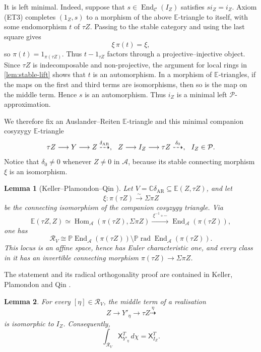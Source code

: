 \documentclass[11pt,reqno]{article}
\numberwithin{equation}{section}
\newtheorem{lemma}[lemma]{Lemma}
\theoremstyle{definition}
\DeclareMathOperator{\End}{End}
\DeclareMathOperator{\Hom}{Hom}
\newcommand{\C}{\mathcal C}
\newcommand{\A}{\mathcal A}
\newcommand{\Pcal}{\mathcal P}
\newcommand{\E}{\mathbb E}
\newcommand{\X}{\mathsf X}
\newcommand{\kk}{\mathbb C}
\newcommand{\etri}{\dashrightarrow}
\begin{document}
It is left minimal.  Indeed, suppose that $s\in\End_{\C}(I_Z)$ satisfies $s i_Z=i_Z$.  Axiom \textup{(ET3)} completes $(1_Z,s)$ to a morphism of the above $\E$-triangle to itself, with some endomorphism $t$ of $\tau Z$.  Passing to the stable category and using the last square gives
\[
 \xi\,\pi(t)=\xi,
\]
so $\pi(t)=1_{\pi(\tau Z)}$.  Thus $t-1_{\tau Z}$ factors through a projective--injective object. Since $\tau Z$ is indecomposable and non-projective, the argument for local rings in \cref{lem:stable-lift} shows that $t$ is an automorphism.  In a morphism of $\E$-triangles, if the maps on the first and third terms are isomorphisms, then so is the map on the middle term. Hence $s$ is an automorphism.  Thus $i_Z$ is a minimal left $\Pcal$-approximation.

We therefore fix an Auslander--Reiten $\E$-triangle and this minimal companion cosyzygy $\E$-triangle
\begin{equation}\label{eq:AR-and-cosy}
 \tau Z\longrightarrow Y\longrightarrow Z\overset{\delta_{\mathrm{AR}}}{\etri},
 \hspace{2.5mm}
 Z\longrightarrow I_Z\longrightarrow\tau Z\overset{\delta_0}{\etri},
 \hspace{2.5mm}I_Z\in\Pcal.
\end{equation}
Notice that $\delta_0\ne0$ whenever $Z\ne0$ in $\A$, because its stable connecting morphism $\xi$ is an isomorphism.

\begin{lemma}[Keller--Plamondon--Qin \cite{KellerPlamondonQin}]\label{known:AR-locus}
Let $V=\kk\delta_{\mathrm{AR}}\subseteq\E(Z,\tau Z)$, and let
\[
 \xi\colon\pi(\tau Z)\xrightarrow{\sim}\Sigma\pi Z
\]
be the connecting isomorphism of the companion cosyzygy triangle.  Via
\[
 \E(\tau Z,Z)
 \simeq\Hom_{\A}(\pi(\tau Z),\Sigma\pi Z)
 \xrightarrow{\ \xi^{-1}\circ-\ }
 \End_{\A}(\pi(\tau Z)),
\]
one has
\[
 \mathcal R_V
 \cong
 \mathbb P\End_{\A}(\pi(\tau Z))
 \setminus
 \mathbb P\operatorname{rad}\End_{\A}(\pi(\tau Z)).
\]
This locus is an affine space, hence has Euler characteristic one, and every class in it has an invertible connecting morphism $\pi(\tau Z)\to\Sigma\pi Z$.
\end{lemma}

The statement and its radical orthogonality proof are contained in Keller, Plamondon and Qin \cite[Section~4.3, proof of Theorem~4.8, pp.~14--15]{KellerPlamondonQin}.

\begin{lemma}\label{lem:AR-loci}
For every $[\eta]\in\mathcal R_V$, the middle term of a realisation
\[
 Z\longrightarrow Y'_\eta\longrightarrow\tau Z\overset{\eta}{\etri}
\]
is isomorphic to $I_Z$.  Consequently,
\[
 \int_{\mathcal R_V}\X^T_{Y'_\eta}\,d\chi=\X^T_{I_Z}.
\]
\end{lemma}
\end{document}
